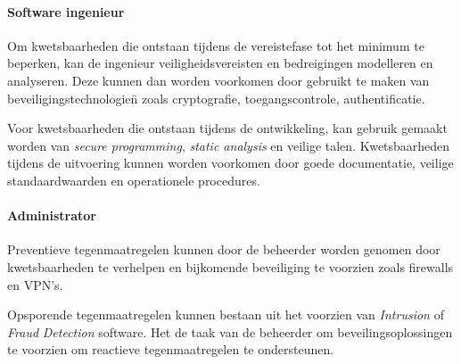 \documentclass[../main.tex]{subfiles}
\begin{document}
\paragraph{Software ingenieur}
Om kwetsbaarheden die ontstaan tijdens de vereistefase tot het minimum te beperken, kan de ingenieur veiligheidsvereisten en bedreigingen modelleren en analyseren. Deze kunnen dan worden voorkomen door gebruikt te maken van beveiligingstechnologie\"n zoals cryptografie, toegangscontrole, authentificatie.

Voor kwetsbaarheden die ontstaan tijdens de ontwikkeling, kan gebruik gemaakt worden van \textit{secure programming}, \textit{static analysis} en veilige talen. Kwetsbaarheden tijdens de uitvoering kunnen worden voorkomen door goede documentatie, veilige standaardwaarden en operationele procedures.

\paragraph{Administrator}
Preventieve tegenmaatregelen kunnen door de beheerder worden genomen door kwetsbaarheden te verhelpen en bijkomende beveiliging te voorzien zoals firewalls en VPN's.

Opsporende tegenmaatregelen kunnen bestaan uit het voorzien van \textit{Intrusion} of \textit{Fraud} \textit{Detection} software. Het de taak van de beheerder om beveilingsoplossingen te voorzien om reactieve tegenmaatregelen te ondersteunen.
\end{document}
